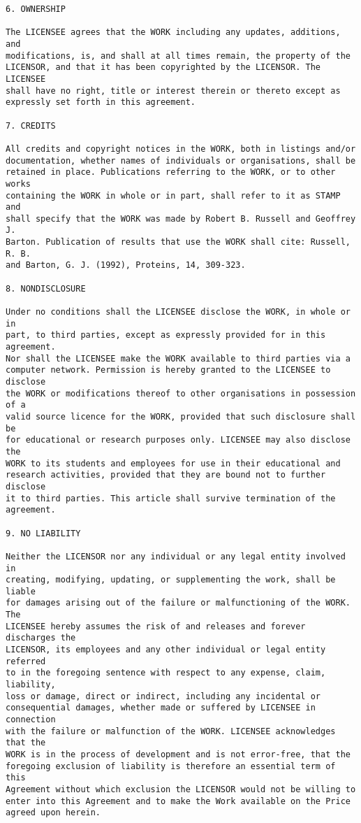 \begin{verbatim}
6. OWNERSHIP

The LICENSEE agrees that the WORK including any updates, additions, and
modifications, is, and shall at all times remain, the property of the
LICENSOR, and that it has been copyrighted by the LICENSOR. The LICENSEE
shall have no right, title or interest therein or thereto except as
expressly set forth in this agreement.

7. CREDITS

All credits and copyright notices in the WORK, both in listings and/or
documentation, whether names of individuals or organisations, shall be
retained in place. Publications referring to the WORK, or to other works
containing the WORK in whole or in part, shall refer to it as STAMP and
shall specify that the WORK was made by Robert B. Russell and Geoffrey J.
Barton. Publication of results that use the WORK shall cite: Russell, R. B.
and Barton, G. J. (1992), Proteins, 14, 309-323.

8. NONDISCLOSURE

Under no conditions shall the LICENSEE disclose the WORK, in whole or in
part, to third parties, except as expressly provided for in this agreement.
Nor shall the LICENSEE make the WORK available to third parties via a
computer network. Permission is hereby granted to the LICENSEE to disclose
the WORK or modifications thereof to other organisations in possession of a
valid source licence for the WORK, provided that such disclosure shall be
for educational or research purposes only. LICENSEE may also disclose the
WORK to its students and employees for use in their educational and
research activities, provided that they are bound not to further disclose
it to third parties. This article shall survive termination of the
agreement.

9. NO LIABILITY

Neither the LICENSOR nor any individual or any legal entity involved in
creating, modifying, updating, or supplementing the work, shall be liable
for damages arising out of the failure or malfunctioning of the WORK. The
LICENSEE hereby assumes the risk of and releases and forever discharges the
LICENSOR, its employees and any other individual or legal entity referred
to in the foregoing sentence with respect to any expense, claim, liability,
loss or damage, direct or indirect, including any incidental or
consequential damages, whether made or suffered by LICENSEE in connection
with the failure or malfunction of the WORK. LICENSEE acknowledges that the
WORK is in the process of development and is not error-free, that the
foregoing exclusion of liability is therefore an essential term of this
Agreement without which exclusion the LICENSOR would not be willing to
enter into this Agreement and to make the Work available on the Price
agreed upon herein.


\end{verbatim}
